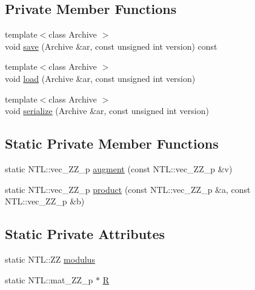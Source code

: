 \subsection*{Private Member Functions}
\begin{DoxyCompactItemize}
\item 
{\footnotesize template$<$class Archive $>$ }\\void \hyperlink{classHE2Ciphertext_a0fcff8ec1b87d67f22da109ba9cc4931}{save} (Archive \&ar, const unsigned int version) const
\item 
{\footnotesize template$<$class Archive $>$ }\\void \hyperlink{classHE2Ciphertext_a2cfa63d6dacdb977ecf6a0043b207b92}{load} (Archive \&ar, const unsigned int version)
\item 
{\footnotesize template$<$class Archive $>$ }\\void \hyperlink{classHE2Ciphertext_a143f80d41791ba3eff4f76b43734daec}{serialize} (Archive \&ar, const unsigned int version)
\end{DoxyCompactItemize}
\subsection*{Static Private Member Functions}
\begin{DoxyCompactItemize}
\item 
static N\+T\+L\+::vec\+\_\+\+Z\+Z\+\_\+p \hyperlink{classHE2Ciphertext_af8e0dca1959cf2cbd7606d48476c435a}{augment} (const N\+T\+L\+::vec\+\_\+\+Z\+Z\+\_\+p \&v)
\item 
static N\+T\+L\+::vec\+\_\+\+Z\+Z\+\_\+p \hyperlink{classHE2Ciphertext_a30047cae60f901b106371d70027bf286}{product} (const N\+T\+L\+::vec\+\_\+\+Z\+Z\+\_\+p \&a, const N\+T\+L\+::vec\+\_\+\+Z\+Z\+\_\+p \&b)
\end{DoxyCompactItemize}
\subsection*{Static Private Attributes}
\begin{DoxyCompactItemize}
\item 
static N\+T\+L\+::\+ZZ \hyperlink{classHE2Ciphertext_a590c7d8432a2a73ebe0607f402c6a46a}{modulus}
\item 
static N\+T\+L\+::mat\+\_\+\+Z\+Z\+\_\+p $\ast$ \hyperlink{classHE2Ciphertext_aad6e0d90aa41cb80b75feebc1b07e1c0}{R}
\end{DoxyCompactItemize}
